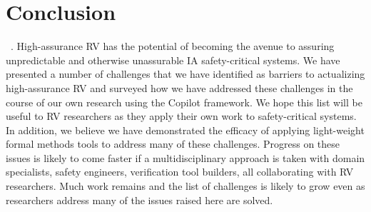\section{Conclusion}~\label{sec:conclusion}.  High-assurance RV has
the potential of becoming the avenue to assuring unpredictable and
otherwise unassurable IA safety-critical systems. We have presented a
number of challenges that we have identified as barriers to
actualizing high-assurance RV and surveyed how we have addressed these
challenges in the course of our own research using the Copilot
framework. We hope this list will be useful to RV researchers as they
apply their own work to safety-critical systems.  In addition, we
believe we have demonstrated the efficacy of applying light-weight
formal methods tools to address many of these challenges.  Progress on
these issues is likely to come faster if a multidisciplinary approach
is taken with domain specialists, safety engineers, verification tool
builders, all collaborating with RV researchers. Much work
remains and the list of challenges is likely to grow even as
researchers address many of the issues raised here are solved. 